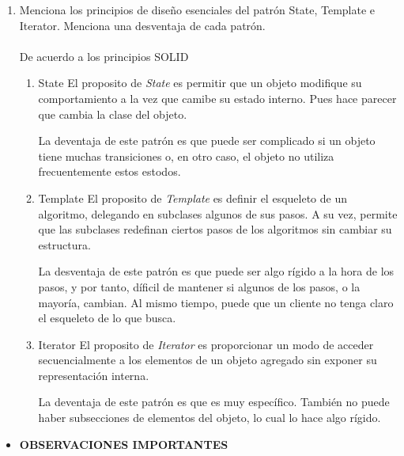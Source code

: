 \documentclass[a4paper,10pt]{article}
\begin{document}
\begin{enumerate}
    
    \item Menciona los principios de diseño esenciales del patrón State, Template e Iterator. Menciona una desventaja de cada patrón.\\\\ De acuerdo a los principios SOLID
        \begin{enumerate}
            \item \colorbox[rgb]{0.53, 0.81, 0.98}{State}
                El proposito de \textit{State} es permitir que un objeto modifique su comportamiento a la vez que camibe su estado interno. Pues hace parecer que cambia la clase del objeto.
                
                La deventaja de este patrón es que puede ser complicado si un objeto tiene muchas transiciones o, en otro caso, el objeto no utiliza frecuentemente estos estodos.


            
            \item \colorbox[rgb]{1.0, 0.71, 0.76}{Template}
                El proposito de \textit{Template} es definir el esqueleto de un algoritmo, delegando en subclases algunos de sus pasos. A su vez, permite que las subclases redefinan ciertos pasos de los algoritmos sin cambiar su estructura.

                La desventaja de este patrón es que puede ser algo rígido a la hora de los pasos, y por tanto, díficil de mantener si algunos de los pasos, o la mayoría, cambian. Al mismo tiempo, puede que un cliente no tenga claro el esqueleto de lo que busca. 

            \item \colorbox[rgb]{0.69, 0.61, 0.85}{Iterator}
                El proposito de \textit{Iterator} es proporcionar un modo de acceder secuencialmente a los elementos de un objeto agregado sin exponer su representación interna.

                La deventaja de este patrón es que es muy específico. También no puede haber subsecciones de elementos del objeto, lo cual lo hace algo rígido.
        \end{enumerate}
\end{enumerate}

\begin{itemize}
    \item \textbf{OBSERVACIONES IMPORTANTES}
\end{itemize}
\end{document}
